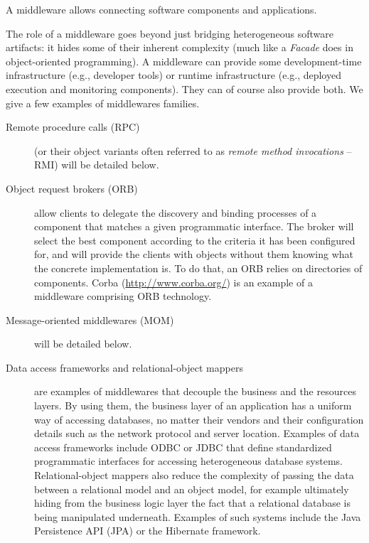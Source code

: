 \begin{definition}
A middleware allows connecting software components and applications.
\end{definition}

The role of a middleware goes beyond just bridging heterogeneous software artifacts: it hides some of their inherent complexity (much like a \emph{Facade} does in object-oriented programming). A middleware can provide some development-time infrastructure (e.g., developer tools) or runtime infrastructure (e.g., deployed execution and monitoring components). They can of course also provide both. We give a few examples of middlewares families.

\begin{description}
  
  \item[Remote procedure calls (RPC)] (or their object variants often referred to as \emph{remote method invocations} -- RMI) will be detailed below.
  
  \item[Object request brokers (ORB)] allow clients to delegate the discovery and binding processes of a component that matches a given programmatic interface. The broker will select the best component according to the criteria it has been configured for, and will provide the clients with objects without them knowing what the concrete implementation is. To do that, an ORB relies on directories of components. Corba (\url{http://www.corba.org/}) is an example of a middleware comprising ORB technology.
  
  \item[Message-oriented middlewares (MOM)] will be detailed below.
  
  \item[Data access frameworks and relational-object mappers] are examples of middlewares that decouple the business and the resources layers. By using them, the business layer of an application has a uniform way of accessing databases, no matter their vendors and their configuration details such as the network protocol and server location. Examples of data access frameworks include ODBC or JDBC that define standardized programmatic interfaces for accessing heterogeneous database systems. Relational-object mappers also reduce the complexity of passing the data between a relational model and an object model, for example ultimately hiding from the business logic layer the fact that a relational database is being manipulated underneath. Examples of such systems include the Java Persistence API (JPA) or the Hibernate framework.
  

\end{description}

